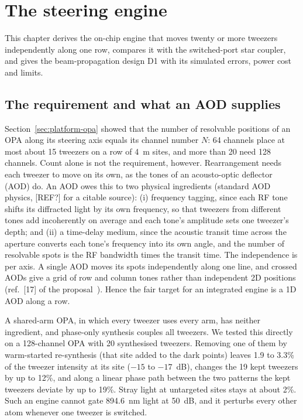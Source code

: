 \section{The steering engine}\label{sec:engine}

This chapter derives the on-chip engine that moves twenty or more tweezers independently along one row, compares it with the switched-port star coupler, and gives the beam-propagation design D1 with its simulated errors, power cost and limits.

\subsection{The requirement and what an AOD supplies}\label{sec:engine-req}

Section~\ref{sec:platform-opa} showed that the number of resolvable positions of an OPA along its steering axis equals its channel number $N$: 64 channels place at most about 15 tweezers on a row of 4~\textmu m sites, and more than 20 need 128 channels. Count alone is not the requirement, however. Rearrangement needs each tweezer to move on its own, as the tones of an acousto-optic deflector (AOD) do. An AOD owes this to two physical ingredients (standard AOD physics, [REF?] for a citable source): (i) frequency tagging, since each RF tone shifts its diffracted light by its own frequency, so that tweezers from different tones add incoherently on average and each tone's amplitude sets one tweezer's depth; and (ii) a time-delay medium, since the acoustic transit time across the aperture converts each tone's frequency into its own angle, and the number of resolvable spots is the RF bandwidth times the transit time. The independence is per axis. A single AOD moves its spots independently along one line, and crossed AODs give a grid of row and column tones rather than independent 2D positions (ref.~[17] of the proposal~\cite{proposal}). Hence the fair target for an integrated engine is a 1D AOD along a row.

A shared-arm OPA, in which every tweezer uses every arm, has neither ingredient, and phase-only synthesis couples all tweezers. We tested this directly on a 128-channel OPA with 20 synthesised tweezers. Removing one of them by warm-started re-synthesis (that site added to the dark points) leaves 1.9 to 3.3\% of the tweezer intensity at its site ($-15$ to $-17$~dB), changes the 19 kept tweezers by up to 12\%, and along a linear phase path between the two patterns the kept tweezers deviate by up to 19\%. Stray light at untargeted sites stays at about 2\%. Such an engine cannot gate 894.6~nm light at 50~dB, and it perturbs every other atom whenever one tweezer is switched.

